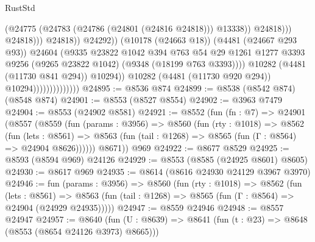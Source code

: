 \begin{lexlean}{RustStd}
\begin{coremodule}
                                                          (@24775
                                                            (@24783
                                                              (@24786 (@24801 (@24816 @24818)))
                                                              @13338))
                                                          @24818)))
                                                    @24818)))
                                              @24818))
                                          @24292))
                                      (@10178 (@24663 @18))
                                      (@4481 (@24667 @293 @93))
                                      @24604
                                      (@9335
                                        @23822
                                        @1042
                                        @394
                                        @763
                                        @54
                                        @29
                                        @1261
                                        @1277
                                        @3393
                                        @9256
                                        (@9265 @23822 @1042)
                                        (@9348 (@18199 @763 @3393))))
                                    @10282
                                    (@4481 (@11730 @841 @294))
                                    @10294))
                                @10282
                                (@4481 (@11730 @920 @294))
                                @10294))))))))))))))
@24895 := @8536 @874
@24899 := @8538 (@8542 @874) (@8548 @874)
@24901 := @8553 (@8527 @8554)
@24902 := @3963 @7479
@24904 := @8553 (@24902 @8581)
@24921 := @8552
    (fun (fn : @7) =>
    @24901
      (@8557
        (@8559
          (fun (params : @3956) =>
          @8560
            (fun (rty : @1018) =>
            @8562
              (fun (lets : @8561) =>
              @8563 (fun (tail : @1268) => @8565 (fun (Γ : @8564) => @24904 @8626))))))
        @8671))
    @969
@24922 := @8677 @8529
@24925 := @8593 (@8594 @969) @24126
@24929 := @8553 (@8585 (@24925 @8601) @8605)
@24930 := @8617 @969
@24935 := @8614 (@8616 @24930 @24129 @3967 @3970)
@24946 := fun (params : @3956) =>
  @8560
    (fun (rty : @1018) =>
    @8562
      (fun (lets : @8561) =>
      @8563 (fun (tail : @1268) => @8565 (fun (Γ : @8564) => @24904 (@24929 @24935)))))
@24947 := @8559 @24946
@24948 := @8557 @24947
@24957 := @8640
    (fun (U : @8639) => @8641 (fun (t : @23) => @8648 (@8553 (@8654 @24126 @3973) @8665)))

\end{coremodule}
\end{lexlean}
